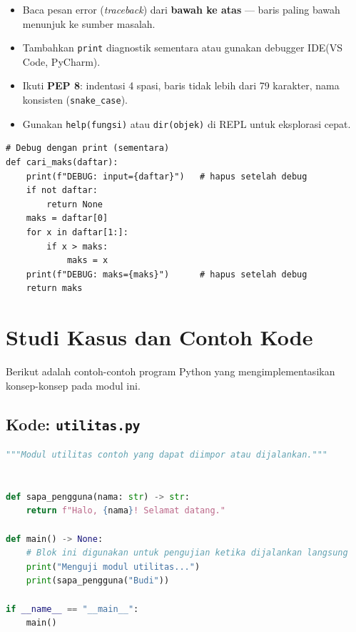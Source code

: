 \documentclass[../main.tex]{subfiles}
\begin{document}
\begin{itemize}[leftmargin=*]
  \item Baca pesan error (\textit{traceback}) dari \textbf{bawah ke atas} --- baris paling bawah menunjuk ke sumber masalah.
  \item Tambahkan \texttt{print} diagnostik sementara atau gunakan debugger IDE\newline (VS Code, PyCharm).
  \item Ikuti \textbf{PEP 8}: indentasi 4 spasi, baris tidak lebih dari 79 karakter, nama konsisten (\texttt{snake\_case}).
  \item Gunakan \texttt{help(fungsi)} atau \texttt{dir(objek)} di REPL untuk eksplorasi cepat.
\end{itemize}

\begin{lstlisting}[caption=Teknik debugging sederhana dengan print]
# Debug dengan print (sementara)
def cari_maks(daftar):
    print(f"DEBUG: input={daftar}")   # hapus setelah debug
    if not daftar:
        return None
    maks = daftar[0]
    for x in daftar[1:]:
        if x > maks:
            maks = x
    print(f"DEBUG: maks={maks}")      # hapus setelah debug
    return maks
\end{lstlisting}

\section{Studi Kasus dan Contoh Kode}

Berikut adalah contoh-contoh program Python yang mengimplementasikan konsep-konsep pada modul ini.

\subsection{Kode: \texttt{utilitas.py}}
\begin{lstlisting}[language=Python,caption={\texttt{utilitas.py}}]
"""Modul utilitas contoh yang dapat diimpor atau dijalankan."""


def sapa_pengguna(nama: str) -> str:
    return f"Halo, {nama}! Selamat datang."

def main() -> None:
    # Blok ini digunakan untuk pengujian ketika dijalankan langsung
    print("Menguji modul utilitas...")
    print(sapa_pengguna("Budi"))

if __name__ == "__main__":
    main()
\end{lstlisting}
\end{document}
